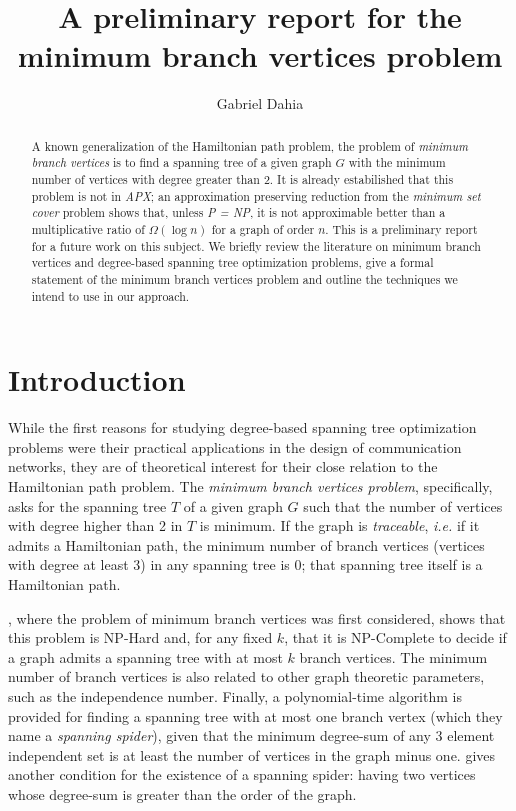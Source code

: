 \documentclass[12pt]{article}
\title{A preliminary report for the minimum branch vertices problem}
\author{Gabriel Dahia\inst{1}}
\begin{document}
 

\maketitle

\begin{abstract}
  A known generalization of the Hamiltonian path problem, the problem of \emph{minimum branch vertices} is to find a spanning tree of a given graph $G$ with the minimum number of vertices with degree greater than 2.
  It is already estabilished that this problem is not in \emph{APX}; an approximation preserving reduction from the \emph{minimum set cover} problem shows that, unless \emph{P = NP}, it is not approximable better than a multiplicative ratio of $\Omega(\log n )$ for a graph of order $n$.
  This is a preliminary report for a future work on this subject.
  We briefly review the literature on minimum branch vertices and degree-based spanning tree optimization problems, give a formal statement of the minimum branch vertices problem and outline the techniques we intend to use in our approach.
\end{abstract}
     
\section{Introduction}

While the first reasons for studying degree-based spanning tree optimization problems were their practical applications in the design of communication networks, they are of theoretical interest for their close relation to the Hamiltonian path problem.
The \emph{minimum branch vertices problem}, specifically, asks for the spanning tree $T$ of a given graph $G$ such that the number of vertices with degree higher than 2 in $T$ is minimum.
If the graph is \emph{traceable}, \emph{i.e.} if it admits a Hamiltonian path, the minimum number of branch vertices (vertices with degree at least 3) in any spanning tree is 0; that spanning tree itself is a Hamiltonian path.

\cite{gargano2004}, where the problem of minimum branch vertices was first considered, shows that this problem is NP-Hard and, for any fixed $k$, that it is NP-Complete to decide if a graph admits a spanning tree with at most $k$ branch vertices. 
The minimum number of branch vertices is also related to other graph theoretic parameters, such as the independence number.
Finally, a polynomial-time algorithm is provided for finding a spanning tree with at most one branch vertex (which they name a \emph{spanning spider}), given that the minimum degree-sum of any 3 element independent set is at least the number of vertices in the graph minus one.
\cite{flandrin2008} gives another condition for the existence of a spanning spider: having two vertices whose degree-sum is greater than the order of the graph. 
\end{document}
